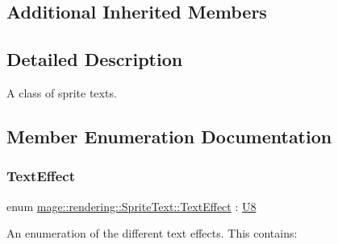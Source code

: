 \subsection*{Additional Inherited Members}


\subsection{Detailed Description}
A class of sprite texts. 

\subsection{Member Enumeration Documentation}
\mbox{\label{classmage_1_1rendering_1_1_sprite_text_af07ecf28d2ab8997c011cab74e799ef7}} 
\subsubsection{\texorpdfstring{Text\+Effect}{TextEffect}}
{\footnotesize\ttfamily enum \mbox{\hyperlink{classmage_1_1rendering_1_1_sprite_text_af07ecf28d2ab8997c011cab74e799ef7}{mage\+::rendering\+::\+Sprite\+Text\+::\+Text\+Effect}} \+: \mbox{\hyperlink{namespacemage_a30677c03d683c4c35630c25f6ff3fb7f}{U8}}\hspace{0.3cm}{\ttfamily [strong]}}

An enumeration of the different text effects. This contains\+:

